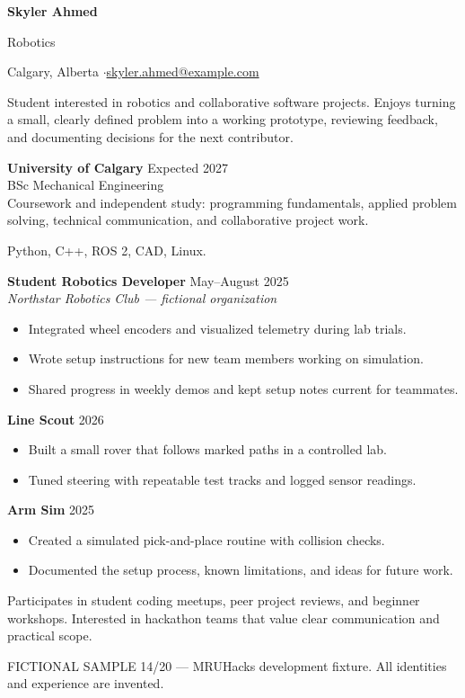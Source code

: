 
{\Huge\bfseries Skyler Ahmed}\par
{\large\color{accent} Robotics}\par
Calgary, Alberta \enspace$\cdot$\enspace \href{mailto:skyler.ahmed@example.com}{skyler.ahmed@example.com}

Student interested in robotics and collaborative software projects.
Enjoys turning a small, clearly defined problem into a working prototype,
reviewing feedback, and documenting decisions for the next contributor.

\textbf{University of Calgary} \hfill Expected 2027\\
BSc Mechanical Engineering\\
Coursework and independent study: programming fundamentals, applied problem solving,
technical communication, and collaborative project work.

Python, C++, ROS 2, CAD, Linux.

\textbf{Student Robotics Developer} \hfill May--August 2025\\
\textit{Northstar Robotics Club --- fictional organization}
\begin{itemize}
\item Integrated wheel encoders and visualized telemetry during lab trials.
\item Wrote setup instructions for new team members working on simulation.
\item Shared progress in weekly demos and kept setup notes current for teammates.
\end{itemize}

\textbf{Line Scout} \hfill 2026
\begin{itemize}
\item Built a small rover that follows marked paths in a controlled lab.
\item Tuned steering with repeatable test tracks and logged sensor readings.
\end{itemize}
\textbf{Arm Sim} \hfill 2025
\begin{itemize}
\item Created a simulated pick-and-place routine with collision checks.
\item Documented the setup process, known limitations, and ideas for future work.
\end{itemize}

Participates in student coding meetups, peer project reviews, and beginner workshops.
Interested in hackathon teams that value clear communication and practical scope.

\vfill
{\footnotesize\color{gray} FICTIONAL SAMPLE 14/20 --- MRUHacks development fixture.
All identities and experience are invented.}

